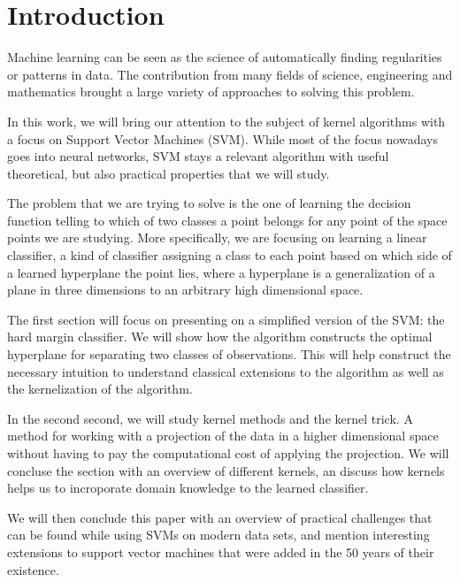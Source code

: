 \section{Introduction}

Machine learning can be seen as the science of automatically finding regularities or patterns in data. The contribution from many fields of science, engineering and mathematics brought a large variety of approaches to solving this problem.

In this work, we will bring our attention to the subject of kernel algorithms with a focus on Support Vector Machines (SVM). While most of the focus nowadays goes into neural networks, SVM stays a relevant algorithm with useful theoretical, but also practical properties that we will study.

The problem that we are trying to solve is the one of learning the decision function telling to which of two classes a point belongs for any point of the space points we are studying. More specifically, we are focusing on learning a linear classifier, a kind of classifier assigning a class to each point based on which side of a learned hyperplane the point lies, where a hyperplane is a generalization of a plane in three dimensions to an arbitrary high dimensional space.

The first section will focus on presenting on a simplified version of the SVM: the hard margin classifier. We will show how the algorithm constructs the optimal hyperplane for separating two classes of observations. This will help construct the necessary intuition to understand classical extensions to the algorithm as well as the kernelization of the algorithm.

In the second second, we will study kernel methods and the kernel trick. A method for working with a projection of the data in a higher dimensional space without having to pay the computational cost of applying the projection. We will concluse the section with an overview of different kernels, an discuss how kernels helps us to incroporate domain knowledge to the learned classifier.

We will then conclude this paper with an overview of practical challenges that can be found while using SVMs on modern data sets, and mention interesting extensions to support vector machines that were added in the 50 years of their existence.


